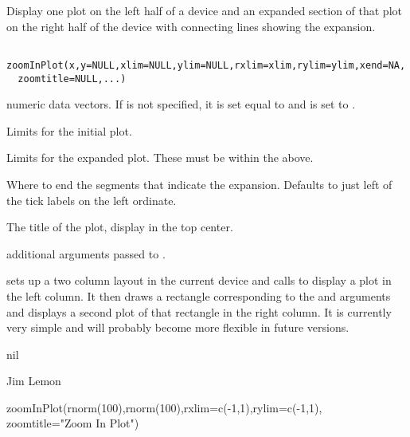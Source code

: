 \begin{Description}\relax
Display one plot on the left half of a device and an expanded section of that
plot on the right half of the device with connecting lines showing the expansion.
\end{Description}
\begin{Usage}
\begin{verbatim}
 zoomInPlot(x,y=NULL,xlim=NULL,ylim=NULL,rxlim=xlim,rylim=ylim,xend=NA,
  zoomtitle=NULL,...)
\end{verbatim}
\end{Usage}
\begin{Arguments}
\begin{ldescription}
\item[\code{x,y}] numeric data vectors. If  is not specified, it is set equal
to  and  is set to .
\item[\code{xlim,ylim}] Limits for the initial plot.
\item[\code{rxlim,rylim}] Limits for the expanded plot. These must be within the above.
\item[\code{xend}] Where to end the segments that indicate the expansion. Defaults to
just left of the tick labels on the left ordinate.
\item[\code{zoomtitle}] The title of the plot, display in the top center.
\item[\code{...}] additional arguments passed to .
\end{ldescription}
\end{Arguments}
\begin{Details}\relax
{} sets up a two column layout in the current device and calls
 to display a plot in the left column. It then draws a rectangle
corresponding to the  and  arguments and displays a
second plot of that rectangle in the right column. It is currently very simple
and will probably become more flexible in future versions.
\end{Details}
\begin{Value}
nil
\end{Value}
\begin{Author}\relax
Jim Lemon
\end{Author}
\begin{SeeAlso}\relax
{}
\end{SeeAlso}
\begin{Examples}
\begin{ExampleCode}
 zoomInPlot(rnorm(100),rnorm(100),rxlim=c(-1,1),rylim=c(-1,1),
  zoomtitle="Zoom In Plot")
\end{ExampleCode}
\end{Examples}

